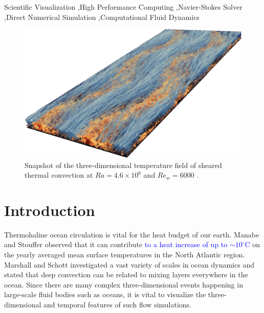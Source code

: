 \documentclass[5p,times]{elsarticle}
\begin{document}
\begin{frontmatter}
\begin{abstract}
\end{abstract}

\begin{keyword}

Scientific Visualization \sep High Performance Computing \sep Navier-Stokes Solver \sep Direct Numerical Simulation \sep Computational Fluid Dynamics

\end{keyword}

\end{frontmatter}


\begin{figure}[!hbt]
	\centering
	\includegraphics[width=\linewidth]{flowfield}%
	\caption{\label{fig:flowfield} Snapshot of the three-dimensional temperature field of sheared thermal convection at $ Ra=4.6 \times 10^6 $ and $ Re_w=6000 $ \cite{bla18}.}
\end{figure}

\section{Introduction}
\label{sec:Introduction}

Thermohaline ocean circulation \cite{rah00} is vital for the heat budget of our earth. Manabe and Stouffer \cite{man88} observed that it can contribute \textcolor{blue}{to a heat increase of up to $ \sim 10 ^ \circ $C} on the yearly averaged mean surface temperatures in the North Atlantic region. Marshall and Schott \cite{mar99} investigated a vast variety of scales in ocean dynamics and stated that deep convection can be related to mixing layers everywhere in the ocean. Since there are many complex three-dimensional events happening in large-scale fluid bodies such as oceans, it is vital to visualize the three-dimensional and temporal features of such flow simulations.
\end{document}
